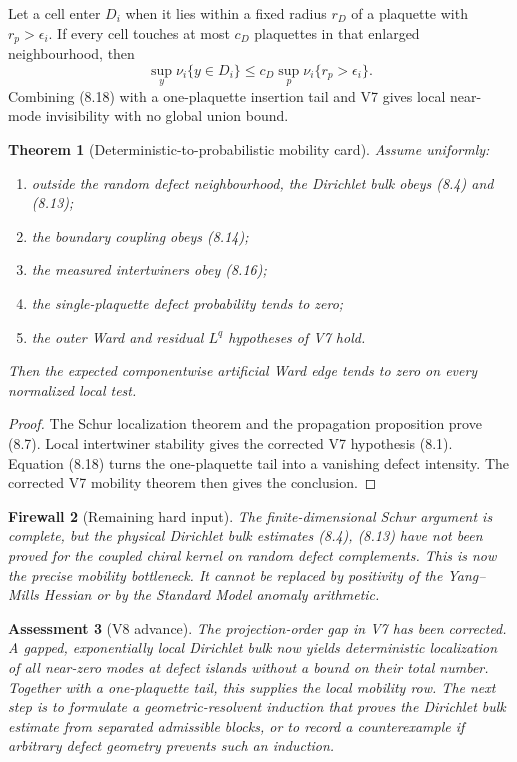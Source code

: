 \documentclass[11pt]{article}
\newtheorem{theorem}{Theorem}[section]
\newtheorem{assessment}[theorem]{Assessment}
\newtheorem{firewall}[theorem]{Firewall}
\begin{document}
Let a cell enter \(D_i\) when it lies within a fixed radius \(r_D\) of a
plaquette with \(r_p>\epsilon_i\).  If every cell touches at most
\(c_D\) plaquettes in that enlarged neighbourhood, then
\[
 \sup_y\nu_i\{y\in D_i\}
 \leq
 c_D\sup_p\nu_i\{r_p>\epsilon_i\}.
 \tag{8.18}
\]
Combining (8.18) with a one-plaquette insertion tail and V7 gives local
near-mode invisibility with no global union bound.

\begin{theorem}[Deterministic-to-probabilistic mobility card]
\label{thm:v11v8-mobility-card}
Assume uniformly:
\begin{enumerate}[label=\textnormal{(\roman*)}]
\item outside the random defect neighbourhood, the Dirichlet bulk obeys
(8.4) and (8.13);
\item the boundary coupling obeys (8.14);
\item the measured intertwiners obey (8.16);
\item the single-plaquette defect probability tends to zero;
\item the outer Ward and residual \(L^q\) hypotheses of V7 hold.
\end{enumerate}
Then the expected componentwise artificial Ward edge tends to zero on
every normalized local test.
\end{theorem}

\begin{proof}
The Schur localization theorem and the propagation proposition prove
(8.7).  Local intertwiner stability gives the corrected V7 hypothesis
(8.1).  Equation (8.18) turns the one-plaquette tail into a vanishing
defect intensity.  The corrected V7 mobility theorem then gives the
conclusion.
\end{proof}

\begin{firewall}[Remaining hard input]
\label{fw:v11v8-hard-input}
The finite-dimensional Schur argument is complete, but the physical
Dirichlet bulk estimates (8.4), (8.13) have not been proved for the
coupled chiral kernel on random defect complements.  This is now the
precise mobility bottleneck.  It cannot be replaced by positivity of the
Yang--Mills Hessian or by the Standard Model anomaly arithmetic.
\end{firewall}

\begin{assessment}[V8 advance]
\label{ass:v11v8}
The projection-order gap in V7 has been corrected.  A gapped,
exponentially local Dirichlet bulk now yields deterministic localization
of all near-zero modes at defect islands without a bound on their total
number.  Together with a one-plaquette tail, this supplies the local
mobility row.  The next step is to formulate a geometric-resolvent
induction that proves the Dirichlet bulk estimate from separated
admissible blocks, or to record a counterexample if arbitrary defect
geometry prevents such an induction.
\end{assessment}
\end{document}
